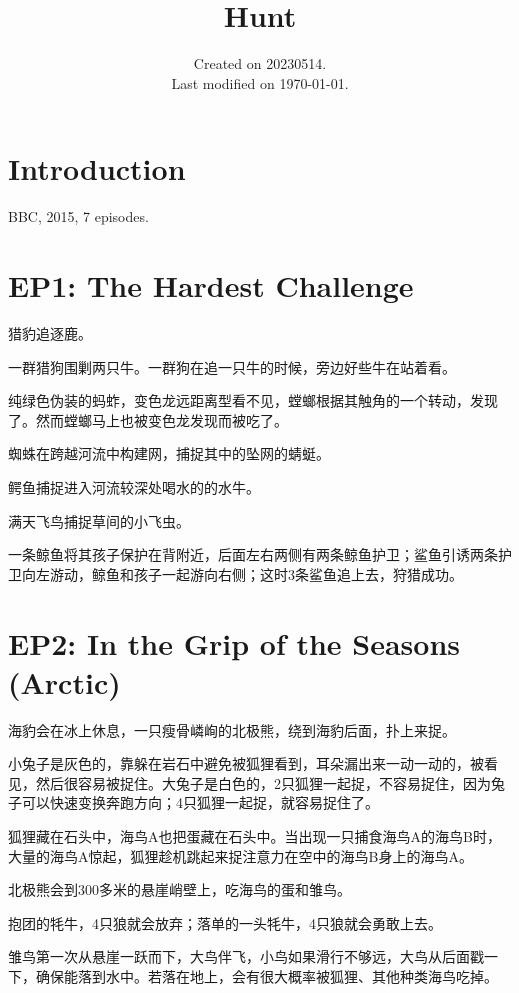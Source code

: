 \documentclass[UTF8]{../../../../RepresentationUniverse}
\begin{document}
\title{Hunt}
\date{Created on 20230514.\\   Last modified on \today.}
\maketitle
\tableofcontents

\chapter{Introduction}

BBC, 2015, 7 episodes.

\chapter{EP1: The Hardest Challenge}

猎豹追逐鹿。

一群猎狗围剿两只牛。一群狗在追一只牛的时候，旁边好些牛在站着看。

纯绿色伪装的蚂蚱，变色龙远距离型看不见，螳螂根据其触角的一个转动，发现了。然而螳螂马上也被变色龙发现而被吃了。

蜘蛛在跨越河流中构建网，捕捉其中的坠网的蜻蜓。

鳄鱼捕捉进入河流较深处喝水的的水牛。

满天飞鸟捕捉草间的小飞虫。

一条鲸鱼将其孩子保护在背附近，后面左右两侧有两条鲸鱼护卫；鲨鱼引诱两条护卫向左游动，鲸鱼和孩子一起游向右侧；这时3条鲨鱼追上去，狩猎成功。


\chapter{EP2: In the Grip of the Seasons (Arctic)}
海豹会在冰上休息，一只瘦骨嶙峋的北极熊，绕到海豹后面，扑上来捉。

小兔子是灰色的，靠躲在岩石中避免被狐狸看到，耳朵漏出来一动一动的，被看见，然后很容易被捉住。大兔子是白色的，2只狐狸一起捉，不容易捉住，因为兔子可以快速变换奔跑方向；4只狐狸一起捉，就容易捉住了。

狐狸藏在石头中，海鸟A也把蛋藏在石头中。当出现一只捕食海鸟A的海鸟B时，大量的海鸟A惊起，狐狸趁机跳起来捉注意力在空中的海鸟B身上的海鸟A。

北极熊会到300多米的悬崖峭壁上，吃海鸟的蛋和雏鸟。

抱团的牦牛，4只狼就会放弃；落单的一头牦牛，4只狼就会勇敢上去。

雏鸟第一次从悬崖一跃而下，大鸟伴飞，小鸟如果滑行不够远，大鸟从后面戳一下，确保能落到水中。若落在地上，会有很大概率被狐狸、其他种类海鸟吃掉。
\end{document}
